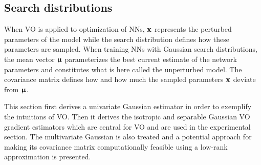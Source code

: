 


\subsection{Search distributions}
When \gls{VO} is applied to optimization of \glspl{NN}, ${\mathbf{x}}$ represents the perturbed parameters of the model while the search distribution defines how these parameters are sampled. When training \glspl{NN} with Gaussian search distributions, the mean vector ${\boldsymbol{\upmu}}$ parameterizes the best current estimate of the network parameters and constitutes what is here called the unperturbed model. The covariance matrix defines how and how much the sampled parameters ${\mathbf{x}}$ deviate from ${\boldsymbol{\upmu}}$.


This section first derives a univariate Gaussian estimator in order to exemplify the intuitions of \gls{VO}. Then it derives the isotropic and separable Gaussian \gls{VO} gradient estimators which are central for \gls{VO} and are used in the experimental section. 
The multivariate Gaussian is also treated and a potential approach for making its covariance matrix computationally feasible using a low-rank approximation is presented.


